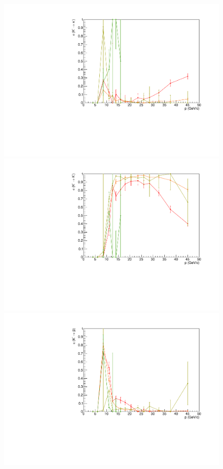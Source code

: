 \begin{figure}[!p]
  \centering
	\includegraphics[scale=0.38]{./gfx/Km_pi.pdf}
  \includegraphics[scale=0.38]{./gfx/Km_K.pdf}
  \includegraphics[scale=0.38]{./gfx/Km_p.pdf}

\end{figure}
